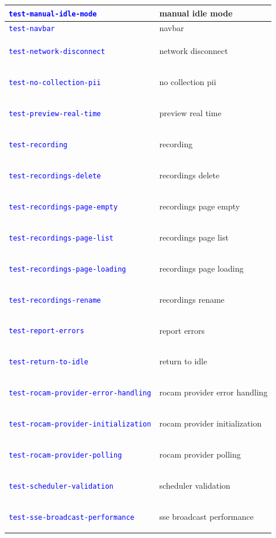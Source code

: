 \documentclass[12pt, titlepage]{article}
\newcommand{\tiddef}[1]{\hypertarget{tid:#1}{\textcolor{blue}{\texttt{#1}}}}
\begin{document}
\begin{longtable}{|>{\raggedright\arraybackslash}p{5cm}|>{\raggedright\arraybackslash}p{9cm}|}
  \tiddef{test-manual-idle-mode}                       & manual idle mode                       \\ \hline
  \tiddef{test-navbar}                                 & navbar                                 \\ \hline
  \tiddef{test-network-disconnect}                     & network disconnect                     \\ \hline
  \tiddef{test-no-collection-pii}                      & no collection pii                      \\ \hline
  \tiddef{test-preview-real-time}                      & preview real time                      \\ \hline
  \tiddef{test-recording}                              & recording                              \\ \hline
  \tiddef{test-recordings-delete}                      & recordings delete                      \\ \hline
  \tiddef{test-recordings-page-empty}                  & recordings page empty                  \\ \hline
  \tiddef{test-recordings-page-list}                   & recordings page list                   \\ \hline
  \tiddef{test-recordings-page-loading}                & recordings page loading                \\ \hline
  \tiddef{test-recordings-rename}                      & recordings rename                      \\ \hline
  \tiddef{test-report-errors}                          & report errors                          \\ \hline
  \tiddef{test-return-to-idle}                         & return to idle                         \\ \hline
  \tiddef{test-rocam-provider-error-handling}          & rocam provider error handling          \\ \hline
  \tiddef{test-rocam-provider-initialization}          & rocam provider initialization          \\ \hline
  \tiddef{test-rocam-provider-polling}                 & rocam provider polling                 \\ \hline
  \tiddef{test-scheduler-validation}                   & scheduler validation                   \\ \hline
  \tiddef{test-sse-broadcast-performance}              & sse broadcast performance              \\ \hline

\end{longtable}
\end{document}
